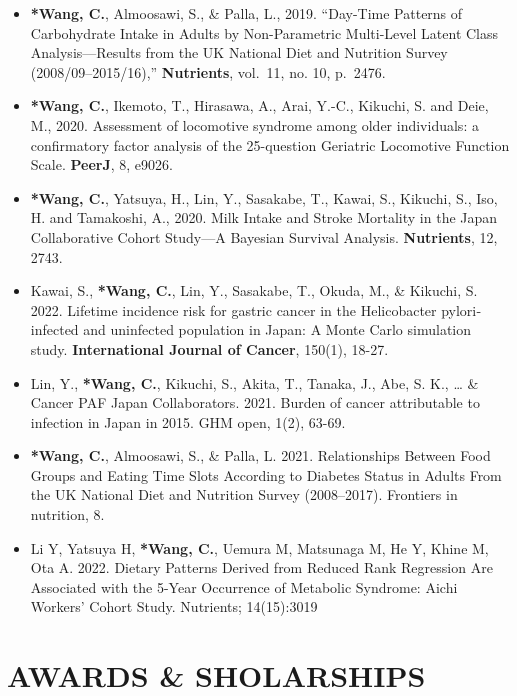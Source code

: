 \documentclass[10pt,]{article}
\begin{document}
\begin{itemize}
\item
  \textbf{*Wang, C.}, Almoosawi, S., \& Palla, L., 2019. ``Day-Time
  Patterns of Carbohydrate Intake in Adults by Non-Parametric
  Multi-Level Latent Class Analysis---Results from the UK National Diet
  and Nutrition Survey (2008/09--2015/16),'' \textbf{Nutrients},
  vol.~11, no. 10, p.~2476.
\item
  \textbf{*Wang, C.}, Ikemoto, T., Hirasawa, A., Arai, Y.-C., Kikuchi,
  S. and Deie, M., 2020. Assessment of locomotive syndrome among older
  individuals: a confirmatory factor analysis of the 25-question
  Geriatric Locomotive Function Scale. \textbf{PeerJ}, 8, e9026.
\item
  \textbf{*Wang, C.}, Yatsuya, H., Lin, Y., Sasakabe, T., Kawai, S.,
  Kikuchi, S., Iso, H. and Tamakoshi, A., 2020. Milk Intake and Stroke
  Mortality in the Japan Collaborative Cohort Study---A Bayesian
  Survival Analysis. \textbf{Nutrients}, 12, 2743.
\item
  Kawai, S., \textbf{*Wang, C.}, Lin, Y., Sasakabe, T., Okuda, M., \&
  Kikuchi, S. 2022. Lifetime incidence risk for gastric cancer in the
  Helicobacter pylori‐infected and uninfected population in Japan: A
  Monte Carlo simulation study. \textbf{International Journal of
  Cancer}, 150(1), 18-27.
\item
  Lin, Y., \textbf{*Wang, C.}, Kikuchi, S., Akita, T., Tanaka, J., Abe,
  S. K., \ldots{} \& Cancer PAF Japan Collaborators. 2021. Burden of
  cancer attributable to infection in Japan in 2015. GHM open, 1(2),
  63-69.
\item
  \textbf{*Wang, C.}, Almoosawi, S., \& Palla, L. 2021. Relationships
  Between Food Groups and Eating Time Slots According to Diabetes Status
  in Adults From the UK National Diet and Nutrition Survey (2008--2017).
  Frontiers in nutrition, 8.
\item
  Li Y, Yatsuya H, \textbf{*Wang, C.}, Uemura M, Matsunaga M, He Y,
  Khine M, Ota A. 2022. Dietary Patterns Derived from Reduced Rank
  Regression Are Associated with the 5-Year Occurrence of Metabolic
  Syndrome: Aichi Workers' Cohort Study. Nutrients; 14(15):3019
\end{itemize}

\hypertarget{awards-sholarships}{%
\section{AWARDS \& SHOLARSHIPS}\label{awards-sholarships}}
\end{document}
